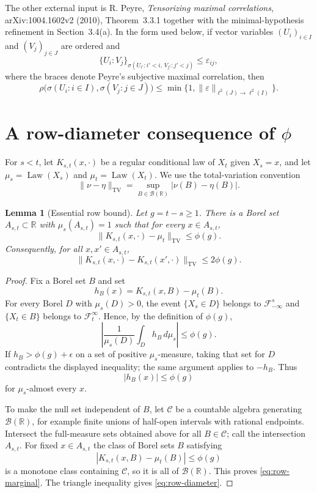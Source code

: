 \documentclass[11pt]{article}
\newtheorem{lemma}[theorem]{Lemma}
\newcommand{\cF}{\mathcal F}
\newcommand{\TV}{\mathrm{TV}}
\newcommand{\Law}{\operatorname{Law}}
\begin{document}
The other external input is R. Peyre, \emph{Tensorizing maximal correlations}, arXiv:1004.1602v2 (2010), Theorem~3.3.1 together with the minimal-hypothesis refinement in Section~3.4(a).  In the form used below, if vector variables $(U_i)_{i\in I}$ and $(V_j)_{j\in J}$ are ordered and
\[
 \{U_i:V_j\}_{\sigma(U_{i'}:i'<i,\,V_{j'}:j'<j)}\le \varepsilon_{ij},
\]
where the braces denote Peyre's subjective maximal correlation, then
\begin{equation}\label{eq:peyre}
 \rho\bigl(\sigma(U_i:i\in I),\sigma(V_j:j\in J)\bigr)
 \le \min\{1,\|\varepsilon\|_{\ell^2(J)\to\ell^2(I)}\}.
\end{equation}

\section{A row-diameter consequence of $\phi$}

For $s<t$, let $K_{s,t}(x,\cdot)$ be a regular conditional law of $X_t$ given $X_s=x$, and let $\mu_s=\Law(X_s)$ and $\mu_t=\Law(X_t)$.  We use the total-variation convention
\[
 \|\nu-\eta\|_{\TV}=\sup_{B\in\mathcal B(\mathbb R)}|\nu(B)-\eta(B)|.
\]

\begin{lemma}[Essential row bound]\label{lem:row}
Let $g=t-s\ge1$.  There is a Borel set $A_{s,t}\subset\mathbb R$ with $\mu_s(A_{s,t})=1$ such that for every $x\in A_{s,t}$,
\begin{equation}\label{eq:row-marginal}
 \|K_{s,t}(x,\cdot)-\mu_t\|_{\TV}\le \phi(g).
\end{equation}
Consequently, for all $x,x'\in A_{s,t}$,
\begin{equation}\label{eq:row-diameter}
 \|K_{s,t}(x,\cdot)-K_{s,t}(x',\cdot)\|_{\TV}\le 2\phi(g).
\end{equation}
\end{lemma}

\begin{proof}
Fix a Borel set $B$ and set
\[
 h_B(x)=K_{s,t}(x,B)-\mu_t(B).
\]
For every Borel $D$ with $\mu_s(D)>0$, the event $\{X_s\in D\}$ belongs to $\cF_{-\infty}^{s}$ and $\{X_t\in B\}$ belongs to $\cF_t^{\infty}$.  Hence, by the definition of $\phi(g)$,
\[
 \left|\frac{1}{\mu_s(D)}\int_D h_B\,d\mu_s\right|\le \phi(g).
\]
If $h_B>\phi(g)+\epsilon$ on a set of positive $\mu_s$-measure, taking that set for $D$ contradicts the displayed inequality; the same argument applies to $-h_B$.  Thus
\[
 |h_B(x)|\le \phi(g)
\]
for $\mu_s$-almost every $x$.

To make the null set independent of $B$, let $\mathcal C$ be a countable algebra generating $\mathcal B(\mathbb R)$, for example finite unions of half-open intervals with rational endpoints.  Intersect the full-measure sets obtained above for all $B\in\mathcal C$; call the intersection $A_{s,t}$.  For fixed $x\in A_{s,t}$ the class of Borel sets $B$ satisfying
\[
 |K_{s,t}(x,B)-\mu_t(B)|\le\phi(g)
\]
is a monotone class containing $\mathcal C$, so it is all of $\mathcal B(\mathbb R)$.  This proves \eqref{eq:row-marginal}.  The triangle inequality gives \eqref{eq:row-diameter}.
\end{proof}
\end{document}
